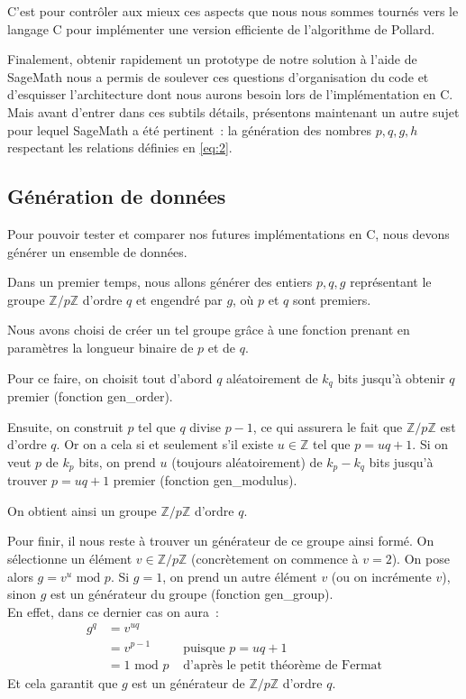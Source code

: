         C'est pour contrôler aux mieux ces aspects que nous nous sommes tournés vers le langage C pour implémenter une version efficiente de l'algorithme de Pollard.

        Finalement, obtenir rapidement un prototype de notre solution à l'aide de SageMath nous a permis de soulever ces questions d'organisation du code et d'esquisser l'architecture dont nous aurons besoin lors de l'implémentation en C.
        Mais avant d'entrer dans ces subtils détails, présentons maintenant un autre sujet pour lequel SageMath a été pertinent~: la génération des nombres $p, q, g, h$ respectant les relations définies en \eqref{eq:2}.

        \subsection{Génération de données}
        Pour pouvoir tester et comparer nos futures implémentations en C, nous devons générer un ensemble de données.

        Dans un premier temps, nous allons générer des entiers $p, q, g$ représentant le groupe $\mathbb{Z}/p\mathbb{Z}$ d'ordre $q$ et engendré par $g$, où $p$ et $q$ sont premiers.

        Nous avons choisi de créer un tel groupe grâce à une fonction prenant en paramètres la longueur binaire de $p$ et de $q$.

		    Pour ce faire, on choisit tout d'abord $q$ aléatoirement de $k_q$ bits jusqu'à obtenir $q$ premier (fonction gen\_order).

		    Ensuite, on construit $p$ tel que $q$ divise $p - 1$, ce qui assurera le fait que $\mathbb{Z}/p\mathbb{Z}$ est d'ordre $q$. Or on a cela si et seulement s'il existe $u \in\mathbb{Z}$ tel que $p = uq + 1$. Si on veut $p$ de $k_p$ bits, on prend $u$ (toujours aléatoirement) de $k_p - k_q$ bits jusqu'à trouver $p = uq + 1$ premier (fonction gen\_modulus).

		    On obtient ainsi un groupe $\mathbb{Z}/p\mathbb{Z}$ d'ordre $q$.

		    Pour finir, il nous reste à trouver un générateur de ce groupe ainsi formé. On sélectionne un élément $v \in \mathbb{Z}/p\mathbb{Z}$ (concrètement on commence à $v = 2$). On pose alors $g = v^u \text{ mod } p$. Si $g = 1$, on prend un autre élément $v$ (ou on incrémente $v$), sinon $g$ est un générateur du groupe (fonction gen\_group).\\
		    En effet, dans ce dernier cas on aura~:
		    \begin{align*}
		    g^q & = v^{uq} \\
            & = v^{p-1} & \text{ puisque } p = uq + 1 \\
            & = 1 \text{ mod } p & \text{ d'après le petit théorème de Fermat}
		    \end{align*}
		    Et cela garantit que $g$ est un générateur de $\mathbb{Z}/p\mathbb{Z}$ d'ordre $q$.\\

